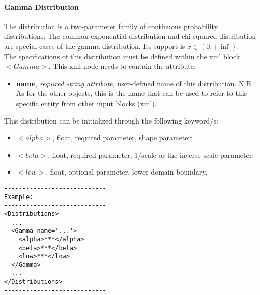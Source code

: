 \paragraph{Gamma Distribution}
\label{Gamma}
The  distribution is a two-parameter family of continuous probability distributions. The common exponential distribution and chi-squared distribution are special cases of the gamma distribution.  Its support is $x \in (0,+\inf)$.
\\ The specifications of this distribution must be defined within the xml block $<Gamma>$. This xml-node needs to contain the attribute:
\vspace{-5mm}
\begin{itemize}
\itemsep0em
\item \textbf{name}, \textit{required string attribute}, user-defined name of this distribution. N.B. As for the other objects, this is the name that can be used to refer to this specific entity from other input blocks (xml).   
\end{itemize}
\vspace{-5mm}
This distribution can be initialized through the following keyword/s:
\begin{itemize}
\item $<alpha>$, float, required parameter, shape parameter;
\item $<beta>$, float, required parameter, 1/scale or the inverse scale parameter;
\item $<low>$, float, optional parameter,  lower domain boundary.
\end{itemize}

\begin{lstlisting}[style=XML]
----------------------------
Example:
----------------------------
<Distributions>
  ...
  <Gamma name='...'>
    <alpha>***</alpha>
    <beta>***</beta>
    <low>***</low>
  </Gamma>
  ...
</Distributions>
----------------------------
\end{lstlisting}

